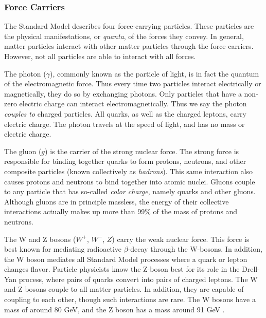 \subsubsection*{Force Carriers}
The Standard Model describes four force-carrying particles. These
particles are the physical manifestations, or \emph{quanta}, of the forces
they convey. In general, matter particles interact with other matter
particles through the force-carriers. However, not all particles are
able to interact with all forces.

The photon ($\gamma$), commonly known as the particle of light,
is in fact the quantum of the electromagnetic
force. Thus every time two particles interact electrically or
magnetically, they do so by exchanging photons. Only particles that
have a non-zero electric charge can interact electromagnetically. Thus
we say the photon \emph{couples to} charged particles. All quarks, as
well as the charged leptons, carry electric charge. The photon travels
at the speed of light, and has no mass or electric charge.

The gluon ($g$) is the carrier of the strong nuclear force. The strong
force is responsible for binding together quarks to form protons,
neutrons, and other composite particles (known collectively as
\emph{hadrons}). This same interaction also causes protons and neutrons to
bind together into atomic nuclei. Gluons couple to any particle
that has so-called \emph{color charge}, namely quarks and
other gluons. Although gluons are in principle massless, the energy of
their collective interactions actually makes up more than 99\% of the
mass of protons and neutrons. %

The W and Z bosons ($W^+$, $W^-$, $Z$) carry the weak nuclear force. This
force is best known for mediating radioactive $\beta$-decay through
the W-bosons. In addition, the W boson mediates all Standard Model
processes where a quark or lepton changes flavor. %
Particle physicists know the Z-boson best for its
role in the Drell-Yan process, where pairs of quarks convert into
pairs of charged leptons. The W and Z bosons couple to all matter
particles. In addition, they are capable of coupling to each other,
though such interactions are rare. The W bosons have a mass of around
80 GeV, and the Z boson has a mass around 91 GeV \cite{pdg}.

